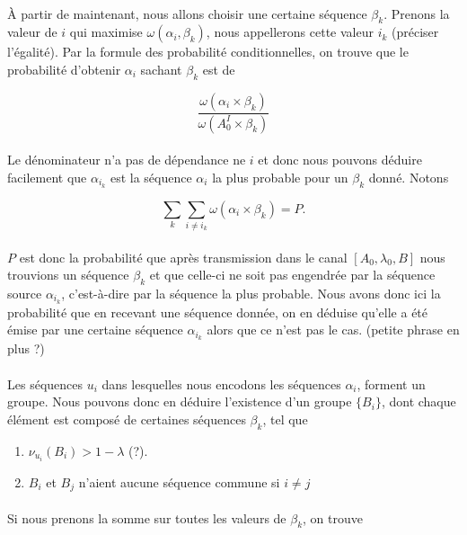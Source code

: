 	\paragraph{}
	À partir de maintenant, nous allons choisir une certaine séquence $\beta_k$.
	Prenons la valeur de $i$ qui maximise $\omega(\alpha_i,\beta_k)$, nous appellerons cette valeur $i_k$ (préciser l'égalité).
	Par la formule des probabilité conditionnelles, on trouve que le probabilité d'obtenir $\alpha_i$ sachant $\beta_k$ est de 
	
	\[\frac{\omega(\alpha_i \times \beta_k)}{\omega(A_0^I \times \beta_k)}\]
	
	\paragraph{}
	Le dénominateur n'a pas de dépendance ne $i$ et donc nous pouvons déduire facilement que $\alpha_{i_k}$ est la séquence $\alpha_i$ la plus probable pour un $\beta_k$ donné.
	Notons
	
	\[\sum_k\sum_{i\neq i_k}\omega(\alpha_i \times \beta_k) = P.\]
	
	\paragraph{}
	$P$ est donc la probabilité que après transmission dans le canal $[A_0,\lambda_0,B]$ nous trouvions un séquence $\beta_k$ et que celle-ci ne soit pas engendrée par 
	la séquence source $\alpha_{i_k}$, c'est-à-dire par la séquence la plus probable. Nous avons donc ici la probabilité que en recevant une séquence donnée, on en déduise
	qu'elle a été émise par une certaine séquence $\alpha_{i_k}$ alors que ce n'est pas le cas. (petite phrase en plus ?)
	
	\paragraph{}
	Les séquences $u_i$ dans lesquelles nous encodons les séquences $\alpha_i$, forment un groupe. Nous pouvons donc en déduire l'existence d'un groupe $\{B_i\}$, dont 
	chaque élément est composé de certaines séquences $\beta_k$, tel que 
	\begin{enumerate}
		\item $\nu_{u_i}(B_i) > 1-\lambda$ (?).
		\item $B_i$ et $B_j$ n'aient aucune séquence commune si $i\neq j$
	\end{enumerate}
	
	\paragraph{}Si nous prenons la somme sur toutes les valeurs de $\beta_k$, on trouve
	
